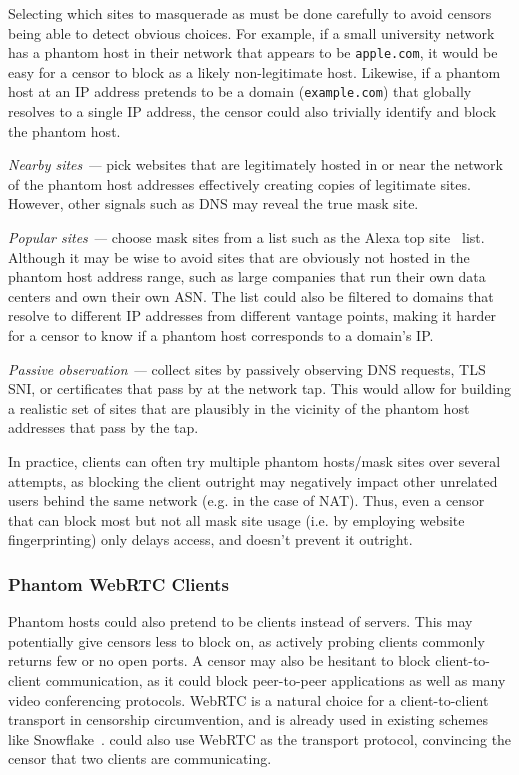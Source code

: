 \documentclass[sigconf]{acmart}
\begin{document}
Selecting which sites to masquerade as must be done carefully to avoid censors
being able to detect obvious choices. For example, if a small university network
has a phantom host in their network that appears to be \texttt{apple.com}, it
would be easy for a censor to block as a likely non-legitimate host. Likewise,
if a phantom host at an IP address pretends to be a domain (\texttt{example.com}) that
globally resolves to a single IP address, the censor could also trivially
identify and block the phantom host.

\textit{Nearby sites ---} pick websites that are
legitimately hosted in or near the network of the phantom host addresses
effectively creating copies of legitimate sites. However, other signals such as 
DNS may reveal the true mask site.

\textit{Popular sites ---} choose mask sites from a list such as the Alexa
top site~\cite{alexa-top500} list. Although it may be wise to avoid
sites that are obviously not hosted in the phantom host address range, such as
large companies that run their own data centers and own their own ASN.
The list could also be filtered to domains that resolve to different IP
addresses from different vantage points, making it harder for a censor to know
if a phantom host corresponds to a domain's IP.

\textit{Passive observation ---} collect sites by passively observing DNS requests, TLS
SNI, or certificates that pass by at the network tap. This would allow for building a realistic set
of sites that are plausibly in the vicinity of the phantom host addresses
that pass by the tap. 

In practice, clients can often try multiple phantom hosts/mask sites over
several attempts, as blocking the client outright may negatively impact other
unrelated users behind the same network (e.g. in the case of NAT). Thus, even a
censor that can block most but not all mask site usage (i.e. by employing 
website fingerprinting) only delays access, and doesn't prevent it outright.

\subsubsection{Phantom WebRTC Clients}
\label{sec:webrtc}

Phantom hosts could also pretend to be clients instead of servers. This may
potentially give censors less to block on, as actively probing clients commonly
returns few or no open ports. A censor may also be hesitant to block
client-to-client communication, as it could block peer-to-peer applications as
well as many video conferencing protocols. WebRTC is a
natural choice for a client-to-client transport in censorship circumvention,
and is already used in existing schemes like
Snowflake~\cite{snowflake}. \scheme could also use WebRTC as the
transport protocol, convincing the censor that two clients are communicating.
\end{document}
